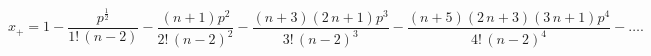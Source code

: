 \begin{equation}
x_{+}=1-{\frac {p^{\frac{1}{2}}}{1!\,(n-2)}}-{\frac {\left (n+1\right
){p}^{2}}{2!\, \left (n-2\right )^{2}}}-{\frac {\left (n+3\right
)\left (2\,n+1 \right ){p}^{3}}{3!\,\left (n-2\right )^{3}}}-{\frac
{\left (n+5 \right )\left (2\,n+3\right )\left (3\,n+1\right
){p}^{4}}{4!\,\left (n-2 \right )^{4}}}-\dots . \label{ser1}
\end{equation}

